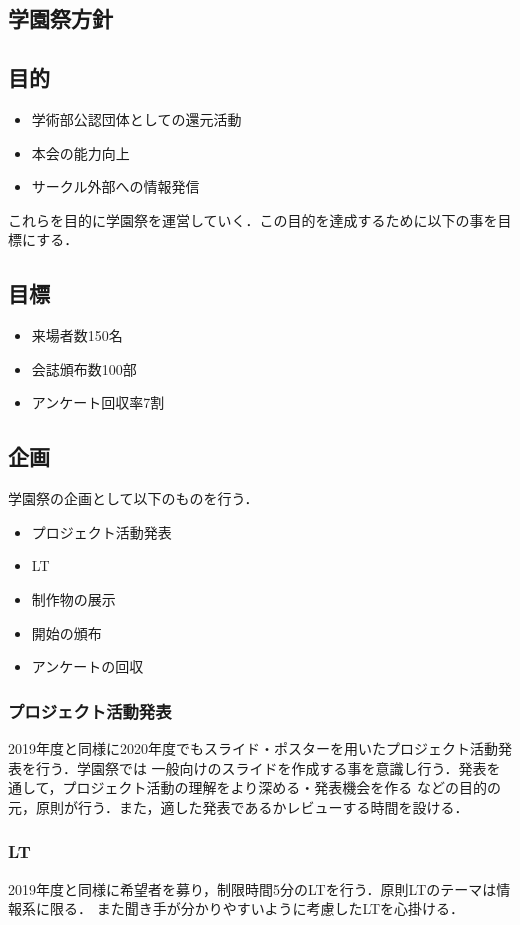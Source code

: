 \subsection*{学園祭方針}


\subsection*{目的}
\begin{itemize}
    \item 学術部公認団体としての還元活動
    \item 本会の能力向上
    \item サークル外部への情報発信
    \end{itemize}
これらを目的に学園祭を運営していく．この目的を達成するために以下の事を目標にする．
\subsection*{目標}
\begin{itemize}
    \item 来場者数150名
    \item 会誌頒布数100部
    \item アンケート回収率7割
    \end{itemize}
\subsection*{企画}
学園祭の企画として以下のものを行う．
\begin{itemize}
    \item プロジェクト活動発表
    \item LT
    \item 制作物の展示
    \item 開始の頒布
    \item アンケートの回収
    \end{itemize}
\subsubsection*{プロジェクト活動発表}
2019年度と同様に2020年度でもスライド・ポスターを用いたプロジェクト活動発表を行う．学園祭では
一般向けのスライドを作成する事を意識し行う．発表を通して，プロジェクト活動の理解をより深める・発表機会を作る
などの目的の元，原則\firstGrade{}が行う．また，適した発表であるかレビューする時間を設ける．

\subsubsection*{LT}
2019年度と同様に希望者を募り，制限時間5分のLTを行う．原則LTのテーマは情報系に限る．
また聞き手が分かりやすいように考慮したLTを心掛ける．

